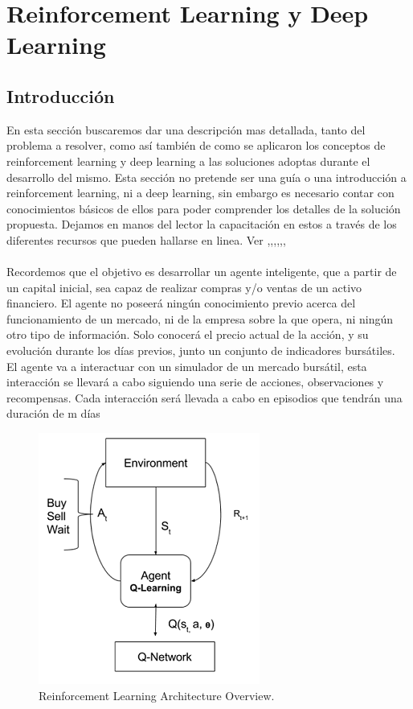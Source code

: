 \chapter{Reinforcement Learning y Deep Learning}


\section{Introducción}

En esta sección buscaremos dar una descripción mas detallada, tanto del problema a resolver, como así también de como se aplicaron los conceptos de reinforcement learning y deep learning a las soluciones adoptas durante el desarrollo del mismo. Esta sección no pretende ser una guía o una introducción a reinforcement learning, ni a deep learning, sin embargo es necesario contar con conocimientos básicos de ellos para poder comprender los detalles de la solución propuesta. Dejamos en manos del lector la capacitación en estos a través de los diferentes recursos que pueden hallarse en linea. Ver \cite{1},\cite{2},\cite{3},\cite{4},\cite{5},\cite{6},
\\\\
Recordemos que el objetivo es desarrollar un agente inteligente, que a partir de un capital inicial, sea capaz de realizar compras y/o ventas de un activo financiero. El agente no poseerá ningún conocimiento previo acerca del funcionamiento de un mercado, ni de la empresa sobre la que opera, ni ningún otro tipo de información. Solo conocerá el precio actual de la acción, y su evolución durante los días previos, junto un conjunto de indicadores bursátiles. 
\\
El agente va a interactuar con un simulador de un mercado bursátil, esta interacción se llevará a cabo siguiendo una serie de acciones, observaciones y recompensas.
Cada interacción será llevada a cabo en episodios que tendrán una duración de m días
\\

\begin{figure}[h!]
	\includegraphics[scale=0.5]{imagenes/deepRLOverview.png}
	\caption{Reinforcement Learning Architecture Overview.}
\end{figure}



